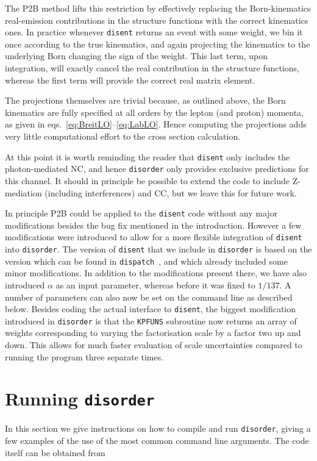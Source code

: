 \documentclass[submission, PhysCodeb]{SciPost}
\newcommand{\disent}{{\tt disent}}
\newcommand{\disorder}{{\tt disorder}}
\begin{document}
The P2B method lifts this restriction by effectively replacing the
Born-kinematics real-emission contributions in the structure functions
with the correct kinematics ones. In practice whenever \disent{}
returns an event with some weight, we bin it once according to the
true kinematics, and again projecting the kinematics to the underlying
Born changing the sign of the weight. This last term, upon integration,
will exactly cancel the real contribution in the structure functions,
whereas the first term will provide the correct real matrix element.

The projections themselves are trivial because, as outlined above, the
Born kinematics are fully specified at all orders by the lepton (and
proton) momenta, as given in
eqs.~\eqref{eq:BreitLO}--\eqref{eq:LabLO}. Hence computing the
projections adds very little computational effort to the cross section
calculation.

At this point it is worth reminding the reader that \disent{} only
includes the photon-mediated NC, and hence \disorder{} only provides
exclusive predictions for this channel. It should in principle be
possible to extend the code to include Z-mediation (including
interferences) and CC, but we leave this for future work.

In principle P2B could be applied to the \disent{} code without any
major modifications besides the bug fix mentioned in the
introduction. However a few modifications were introduced to allow for
a more flexible integration of \disent{} into \disorder. The version
of \disent{} that we include in \disorder{} is based on the version
which can be found in {\tt dispatch}~\cite{Dasgupta:2002dc}, and which
already included some minor modifications. In addition to the
modifications present there, we have also introduced $\alpha$ as an
input parameter, whereas before it was fixed to $1/137$. A number of
parameters can also now be set on the command line as described
below. Besides coding the actual interface to \disent{}, the biggest
modification introduced in \disorder{} is that the {\tt KPFUNS}
subroutine now returns an array of weights corresponding to varying
the factorisation scale by a factor two up and down. This allows for
much faster evaluation of scale uncertainties compared to running the
program three separate times.

\section{Running \disorder{}}
\label{sec:running}
In this section we give instructions on how to compile and run
\disorder{}, giving a few examples of the use of the most common
command line arguments. The code itself can be obtained from
\end{document}
